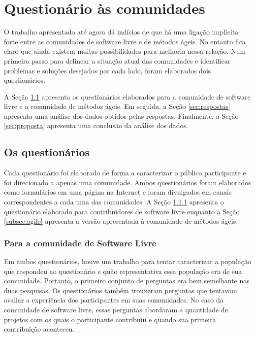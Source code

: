 \chapter{Questionário às comunidades}
\label{cap:pesquisas}

O trabalho apresentado até agora dá indícios de que há uma ligação
implícita forte entre as comunidades de software livre e de métodos
ágeis. No entanto fica claro que ainda existem muitas possibilidades
para melhoria nessa relação. Num primeiro passo para delinear a
situação atual das comunidades e identificar problemas e soluções
desejados por cada lado, foram elaborados dois questionários.

A Seção \ref{sec:questionarios} apresenta os questionários elaborados
para a comunidade de software livre e a comunidade de métodos
ágeis. Em seguida, a Seção \ref{sec:respostas} apresenta uma análise
dos dados obtidos pelas respostas. Finalmente, a Seção
\ref{sec:proposta} apresenta uma conclusão da análise dos dados.

\section{Os questionários}
\label{sec:questionarios}

Cada questionário foi elaborado de forma a caracterizar o público
participante e foi direcionado a apenas uma comunidade. Ambos
questionários foram elaborados como formulários em uma página na
Internet e foram divulgados em canais correspondentes a cada uma das
comunidades. A Seção \ref{subsec:floss} apresenta o questionário
elaborado para contribuidores de software livre enquanto a Seção
\ref{subsec:agile} apresenta a versão apresentada à comunidade de
métodos ágeis.

\subsection{Para a comunidade de Software Livre}
\label{subsec:floss}

Em ambos questionários, houve um trabalho para tentar caracterizar a
população que respondeu ao questionário e quão representativa essa
população era de sua comunidade. Portanto, o primeiro conjunto de
perguntas era bem semelhante nas duas pesquisas. Os questionários
também trouxeram perguntas que tentavam avaliar a experiência dos
participantes em suas comunidades. No caso da comunidade de software
livre, essas perguntas abordaram a quantidade de projetos com os quais
o participante contribuiu e quando sua primeira contribuição
aconteceu.

